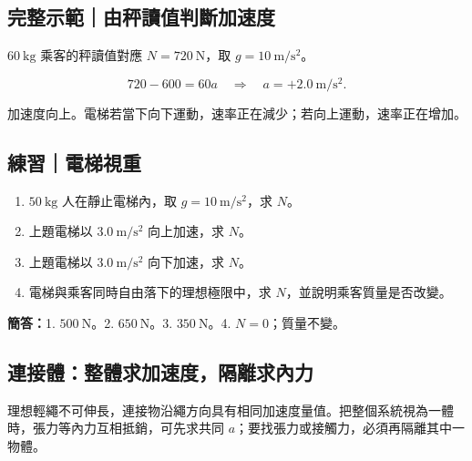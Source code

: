 \documentclass[11pt,a4paper]{article}
\providecommand{\tightlist}{%
  \setlength{\itemsep}{0pt}\setlength{\parskip}{0pt}}
\begin{document}
\begin{HandoutWorkedExample}

\subsection{完整示範｜由秤讀值判斷加速度}\label{ux5b8cux6574ux793aux7bc4ux7531ux79e4ux8b80ux503cux5224ux65b7ux52a0ux901fux5ea6}

\(60\ \mathrm{kg}\) 乘客的秤讀值對應 \(N=720\ \mathrm N\)，取 \(g=10\ \mathrm{m/s^2}\)。

\[
720-600=60a
\quad\Rightarrow\quad
a=+2.0\ \mathrm{m/s^2}.
\]

加速度向上。電梯若當下向下運動，速率正在減少；若向上運動，速率正在增加。

\end{HandoutWorkedExample}

\begin{HandoutSelfCheck}

\subsection{練習｜電梯視重}\label{ux7df4ux7fd2ux96fbux68afux8996ux91cd}

\begin{enumerate}
\def\labelenumi{\arabic{enumi}.}
\tightlist
\item
  \(50\ \mathrm{kg}\) 人在靜止電梯內，取 \(g=10\ \mathrm{m/s^2}\)，求 \(N\)。
\item
  上題電梯以 \(3.0\ \mathrm{m/s^2}\) 向上加速，求 \(N\)。
\item
  上題電梯以 \(3.0\ \mathrm{m/s^2}\) 向下加速，求 \(N\)。
\item
  電梯與乘客同時自由落下的理想極限中，求 \(N\)，並說明乘客質量是否改變。
\end{enumerate}

\textbf{簡答：}1. \(500\ \mathrm N\)。2. \(650\ \mathrm N\)。3. \(350\ \mathrm N\)。4. \(N=0\)；質量不變。

\end{HandoutSelfCheck}

\subsection{連接體：整體求加速度，隔離求內力}\label{ux9023ux63a5ux9ad4ux6574ux9ad4ux6c42ux52a0ux901fux5ea6ux9694ux96e2ux6c42ux5167ux529b}

理想輕繩不可伸長，連接物沿繩方向具有相同加速度量值。把整個系統視為一體時，張力等內力互相抵銷，可先求共同 \(a\)；要找張力或接觸力，必須再隔離其中一物體。
\end{document}
